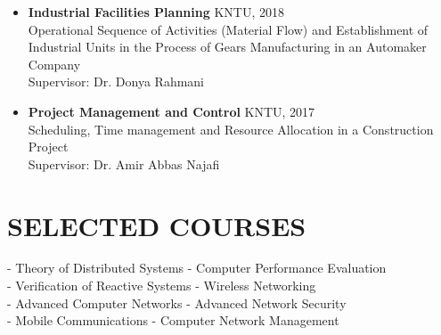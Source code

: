 \documentclass[11pt]{article}
\begin{document}
\begin{itemize}
	
	\item \textbf{Industrial Facilities Planning} \hfill KNTU, 2018\\
	Operational Sequence of Activities (Material Flow) and Establishment of Industrial Units in the Process of Gears Manufacturing in an Automaker Company\\
	Supervisor: Dr. Donya Rahmani
	\href{https://scholar.google.com/citations?user=qUqJT7MAAAAJ&hl=en&oi=ao}{\small \faExternalLink}
	
	\item \textbf{Project Management and Control} \hfill KNTU, 2017\\
	Scheduling, Time management and Resource Allocation in a Construction Project\\
	Supervisor: Dr. Amir Abbas Najafi
	\href{https://scholar.google.com/citations?user=adOQSIEAAAAJ&hl=en&oi=ao}{\small \faExternalLink}
	
	
\end{itemize}




\section{SELECTED COURSES}

		- Theory of Distributed Systems  \hfill - Computer Performance Evaluation\\
		- Verification of Reactive Systems    \hspace{35.8mm} - Wireless Networking \\
		- Advanced Computer Networks \hspace{38.6mm}  - Advanced Network Security\\
		- Mobile Communications \hspace{50.2mm}   - Computer Network Management
\end{document}
